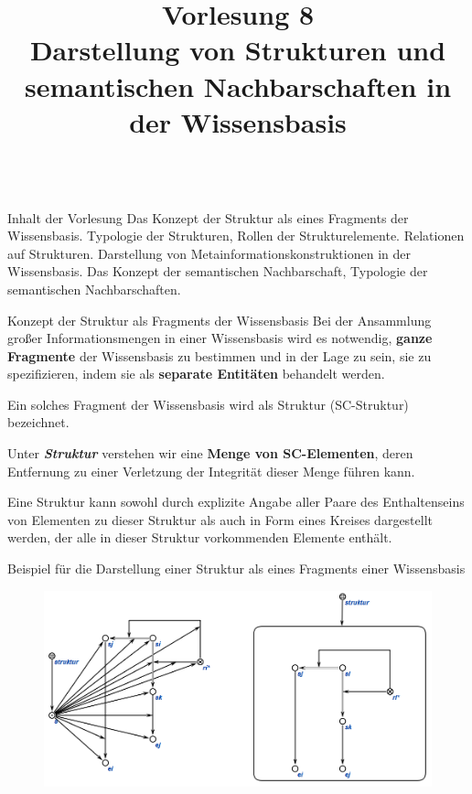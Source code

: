 \title{Vorlesung 8\\Darstellung von Strukturen und semantischen Nachbarschaften in der Wissensbasis}   

\begin{frame}
	\titlepage
\end{frame}

\begin{frame}{\\Inhalt der Vorlesung}
	\topline
	\justifying
	Das Konzept der Struktur als eines Fragments der Wissensbasis. Typologie der Strukturen, Rollen der Strukturelemente. Relationen auf Strukturen. Darstellung von Metainformationskonstruktionen in der Wissensbasis. Das Konzept der semantischen Nachbarschaft, Typologie der semantischen Nachbarschaften.
\end{frame}

\begin{frame}{Konzept der Struktur als Fragments der Wissensbasis}
	\topline
	\justifying
	Bei der Ansammlung großer Informationsmengen in einer Wissensbasis wird es notwendig, \textbf{ganze Fragmente} der Wissensbasis zu bestimmen und in der Lage zu sein, sie zu spezifizieren, indem sie als \textbf{separate Entitäten} behandelt werden.
	
	Ein solches Fragment der Wissensbasis wird als Struktur (SC-Struktur) bezeichnet.
	
	Unter \textbf{\textit{Struktur}} verstehen wir eine \textbf{Menge von SC-Elementen}, deren Entfernung zu einer Verletzung der Integrität dieser Menge führen kann.

	Eine Struktur kann sowohl durch explizite Angabe aller Paare des Enthaltenseins von Elementen zu dieser Struktur als auch in Form eines Kreises dargestellt werden, der alle in dieser Struktur vorkommenden Elemente enthält.
\end{frame}

\begin{frame}{Beispiel für die Darstellung einer Struktur als eines Fragments einer Wissensbasis}
	\topline
	\justifying
	\begin{figure}[H]
		\includegraphics[scale=0.5]{./figures/sd_structures/structure_de.png}
	\end{figure}
\end{frame}

